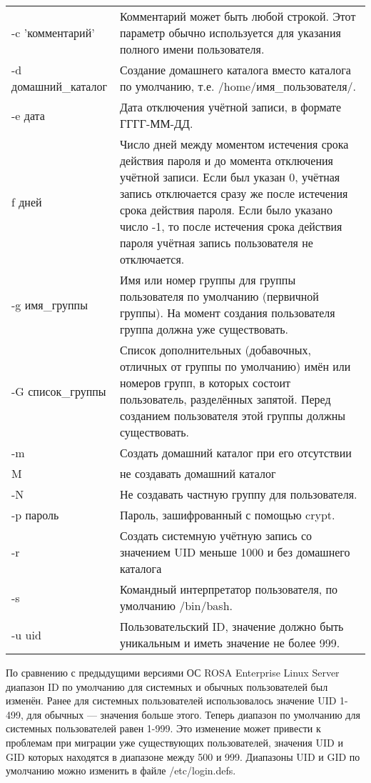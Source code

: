 \documentclass[a4paper,10pt,twoside]{article}
\begin{document}
\begin{longtable}{  m{5cm}  m{12cm}  }  
 -c 'комментарий' & Комментарий может быть любой строкой. Этот параметр обычно используется для указания полного имени пользователя.\\
 -d домашний\_каталог & Создание домашнего каталога вместо каталога по умолчанию, т.е.  /home/имя\_пользователя/.\\
 -e дата & Дата отключения учётной записи, в формате ГГГГ-ММ-ДД.\\
 f дней & Число дней между моментом истечения срока действия пароля и до момента отключения учётной записи.  Если был указан 0, учётная запись отключается сразу же после истечения срока действия пароля. Если было указано число -1, то после истечения срока действия пароля учётная запись пользователя не отключается.\\
 -g имя\_группы & Имя или номер группы для группы пользователя по умолчанию (первичной группы). На момент создания пользователя группа должна уже существовать.\\
 -G список\_группы & Список дополнительных (добавочных, отличных от группы по умолчанию) имён или номеров групп, в которых состоит пользователь, разделённых запятой. Перед созданием пользователя этой группы должны существовать.\\
 -m & Создать домашний каталог при его отсутствии\\
 M & не создавать домашний каталог\\
-N & Не создавать частную группу для пользователя.\\
-p пароль & Пароль, зашифрованный с помощью crypt.\\
-r & Создать системную учётную запись со значением UID меньше 1000 и без домашнего каталога\\
-s & Командный интерпретатор пользователя, по умолчанию /bin/bash.\\
-u uid & Пользовательский ID, значение должно быть уникальным и иметь значение не более 999.\\
\end{longtable}

По сравнению с предыдущими версиями ОС ROSA Enterprise Linux Server диапазон ID по умолчанию для системных и обычных пользователей был изменён. Ранее для системных пользователей использовалось значение UID 1-499, для обычных — значения больше этого. Теперь диапазон по умолчанию для системных пользователей равен 1-999. Это изменение может привести к проблемам при миграции уже существующих пользователей, значения UID и GID которых находятся в диапазоне между 500 и 999. Диапазоны UID и GID по умолчанию можно изменить в файле /etc/login.defs.
\end{document}
